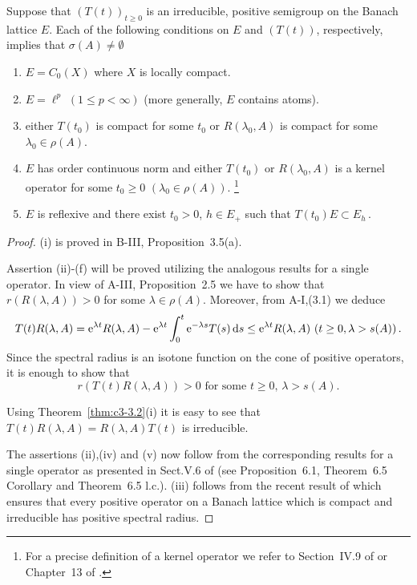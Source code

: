 \begin{theorem}\label{thm:c3-3.7}

Suppose that $(T(t))_{t\geq 0}$ is an irreducible, positive semigroup on the Banach lattice $E$.
Each of the following conditions on $E$ and $(T(t))$, respectively, implies that $\sigma(A) \neq \emptyset$
\begin{enumerate}[\upshape (i)]
	\item
	$E = C_{0}(X)$ where $X$ is locally compact.

	\item 
	$E = \ell^{p}$ $(1 \leq p < \infty)$ (more generally, $E$ contains atoms).

	\item either $T(t_{0})$ is compact for some $t_{0}$ or $R(\lambda_{0},A)$ is compact for some $\lambda_{0} \in \rho(A)$.

	\item 
	$E$ has order continuous norm and either $T(t_{0})$ or $R(\lambda_{0},A)$ is a kernel operator for some $t_{0} \geq 0$ $(\lambda_{0} \in \rho(A))$. 	
	\footnote[1]{For a precise definition of a kernel operator we refer to Section~IV.9 of \citet{schaefer:1974} or Chapter~13 of \citet{zaanen:1983}.}

	\item 
	$E$ is reflexive and there exist $t_{0} > 0$, $h \in E_{+}$ such that $T(t_{0})E \subset E_{h}$\,.
\end{enumerate}
\end{theorem}
\begin{proof}
	(i) is proved in B-III, Proposition~3.5(a).
	
	Assertion (ii)-(f) will be proved utilizing the analogous results for a single operator.
	In view of A-III, Proposition~2.5 we have to show that $r(R(\lambda,A)) > 0$ for some $\lambda \in \rho(A)$.
	Moreover, from A-I,\;(3.1) we deduce
	\begin{align*}
		T(t)R(\lambda,A) = \mathrm{e}^{\lambda t}R(\lambda,A) - \mathrm{e}^{\lambda t}\int_{0}^{t} \mathrm{e}^{-\lambda s}T(s)\mathop{}\!\mathrm{d}{s} \leq \mathrm{e}^{\lambda t}R(\lambda,A) \ (t\geq 0, \lambda>s(A))\,.
	\end{align*}
	Since the spectral radius is an isotone function on the cone of positive operators, it is enough to show that
	\begin{equation}\label{eq:c3-3.12}
		r(T(t)R(\lambda,A)) > 0 \text{ for some } t \geq 0,\, \lambda > s(A).
	\end{equation}
	
	Using Theorem~\ref{thm:c3-3.2}(i) it is easy to see that $T(t)R(\lambda,A) = R(\lambda,A)T(t)$ is irreducible.
	
	The assertions (ii),(iv) and (v) now follow from the corresponding results for a single operator as presented in Sect.V.6 of \citet{schaefer:1974} (see Proposition~6.1, Theorem~6.5 Corollary and Theorem~6.5 l.c.).
	(iii) follows from the recent result of \citet{depagter:1986} which ensures that every positive operator on a Banach lattice which is compact and irreducible has positive spectral radius.
\end{proof}
